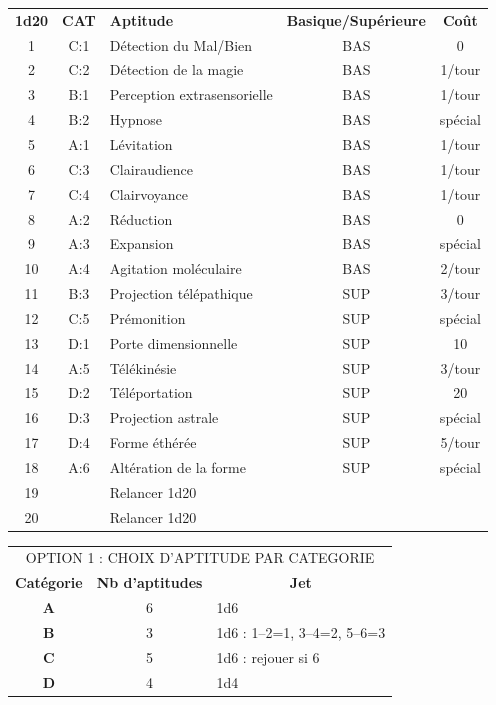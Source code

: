 \documentclass[11pt]{article}
\begin{document}
{\begin{tabular}{cclcc}
\textbf{1d20}& \textbf{CAT} & \textbf{Aptitude} &  \textbf{Basique/Supérieure} & \textbf{Coût} \\
1   & C:1 & Détection du Mal/Bien       & BAS & 0 \\
2   & C:2 & Détection de la magie       & BAS & 1/tour \\
3   & B:1 & Perception extrasensorielle & BAS & 1/tour \\
4   & B:2 & Hypnose                     & BAS & spécial \\
5   & A:1 & Lévitation                  & BAS & 1/tour \\
6   & C:3 & Clairaudience               & BAS & 1/tour \\
7   & C:4 & Clairvoyance                & BAS & 1/tour \\
8   & A:2 & Réduction                   & BAS & 0 \\
9   & A:3 & Expansion                   & BAS & spécial \\
10  & A:4 & Agitation moléculaire       & BAS & 2/tour \\
11  & B:3 & Projection télépathique     & SUP & 3/tour \\
12  & C:5 & Prémonition                 & SUP & spécial \\
13  & D:1 & Porte dimensionnelle        & SUP & 10 \\
14  & A:5 & Télékinésie                 & SUP & 3/tour \\
15  & D:2 & Téléportation               & SUP & 20 \\
16  & D:3 & Projection astrale          & SUP & spécial \\
17  & D:4 & Forme éthérée               & SUP & 5/tour \\
18  & A:6 & Altération de la forme      & SUP & spécial \\
19  &     & Relancer 1d20               &  & \\
20  &     & Relancer 1d20               &  & \\
\end{tabular}

\bigskip

\begin{tabular}{ccl}
\multicolumn{3}{c}{OPTION 1 : CHOIX D'APTITUDE PAR CATEGORIE} \\
\textbf{Catégorie} &  \textbf{Nb d'aptitudes} & \multicolumn{1}{c}{\textbf{Jet}} \\
\textbf{A} & 6 & 1d6 \\
\textbf{B} & 3 & 1d6 : 1--2=1, 3--4=2, 5--6=3 \\
\textbf{C} & 5 & 1d6 : rejouer si 6 \\
\textbf{D} & 4 & 1d4 \\
\end{tabular}


}
\end{document}
